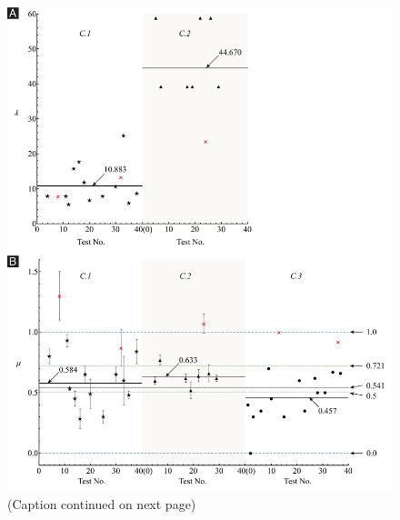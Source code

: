 \documentclass[preprint,10pt,times]{elsarticle}
\numberwithin{equation}{section}
\begin{document}
\begin{figure}
\begin{centering}
\includegraphics[width=1\textwidth]{../Figures_Submit/Distribution_V2.pdf}
\par\end{centering}
\centering{}
\caption{(Caption continued on next page)}
\label{fig:Distribution}
\end{figure}
\end{document}
